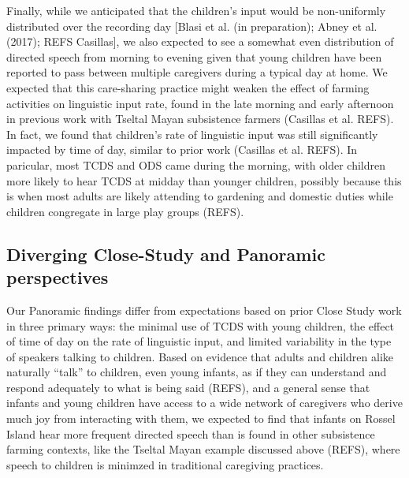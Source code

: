 \documentclass[,man,floatsintext]{apa6}
\begin{document}
Finally, while we anticipated that the children's input would be
non-uniformly distributed over the recording day {[}Blasi et al. (in
preparation); Abney et al. (2017); REFS Casillas{]}, we also expected to
see a somewhat even distribution of directed speech from morning to
evening given that young children have been reported to pass between
multiple caregivers during a typical day at home. We expected that this
care-sharing practice might weaken the effect of farming activities on
linguistic input rate, found in the late morning and early afternoon in
previous work with Tseltal Mayan subsistence farmers (Casillas et al.
REFS). In fact, we found that children's rate of linguistic input was
still significantly impacted by time of day, similar to prior work
(Casillas et al. REFS). In paricular, most TCDS and ODS came during the
morning, with older children more likely to hear TCDS at midday than
younger children, possibly because this is when most adults are likely
attending to gardening and domestic duties while children congregate in
large play groups (REFS).

\subsection{Diverging Close-Study and Panoramic
perspectives}\label{diverging-close-study-and-panoramic-perspectives}

Our Panoramic findings differ from expectations based on prior Close
Study work in three primary ways: the minimal use of TCDS with young
children, the effect of time of day on the rate of linguistic input, and
limited variability in the type of speakers talking to children. Based
on evidence that adults and children alike naturally \enquote{talk} to
children, even young infants, as if they can understand and respond
adequately to what is being said (REFS), and a general sense that
infants and young children have access to a wide network of caregivers
who derive much joy from interacting with them, we expected to find that
infants on Rossel Island hear more frequent directed speech than is
found in other subsistence farming contexts, like the Tseltal Mayan
example discussed above (REFS), where speech to children is minimzed in
traditional caregiving practices.
\end{document}
